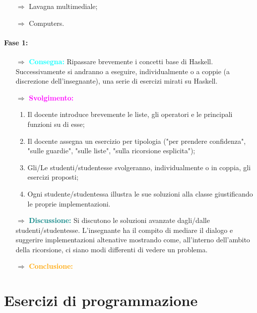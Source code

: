 \begin{itemize}
    \item [$\Rightarrow$] Lavagna multimediale;
    \item [$\Rightarrow$] Computers.
\end{itemize}


\paragraph{Fase 1:}

\begin{itemize}
    \item [$\Rightarrow$] \textbf{\textcolor{cyan}{Consegna:}} Ripassare brevemente i concetti base di Haskell. Successivamente
    si andranno a eseguire, individualmente o a coppie (a discrezione dell'insegnante), una serie di esercizi mirati su Haskell. 
    \item [$\Rightarrow$] \textbf{\textcolor{magenta}{Svolgimento:}}
    \begin{enumerate}
        \item Il docente introduce brevemente le liste, gli operatori e le principali funzioni su di esse;
        \item Il docente assegna un esercizio per tipologia ("per prendere confidenza", "sulle guardie", "sulle liste", "sulla ricorsione esplicita");
        \item Gli/Le studenti/studentesse svolgeranno, individualmente o in coppia, gli esercizi proposti;
        \item Ogni studente/studentessa illustra le sue soluzioni alla classe giustificando le proprie implementazioni.
    \end{enumerate}
    \item [$\Rightarrow$] \textbf{\textcolor{teal}{Discussione:}} Si discutono le soluzioni avanzate dagli/dalle studenti/studentesse.
    L'insegnante ha il compito di mediare il dialogo e suggerire implementazioni altenative mostrando come, all'interno dell'ambito della ricorsione,
    ci siano modi differenti di vedere un problema.
    \item [$\Rightarrow$] \textbf{\textcolor{orange}{Conclusione:}}  
\end{itemize}

\pagebreak

\section{Esercizi di programmazione}\label{prog}

